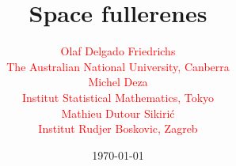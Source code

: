 \documentclass{beamer}
\begin{document}
\title{Space fullerenes}
\author{
{\small
\begin{multicols}{2}
\textcolor{red}{\large Olaf Delgado Friedrichs}\\[2mm]
\textcolor{red}{The Australian National University, Canberra}\\[2mm]
\textcolor{red}{\large Michel Deza}\\[2mm]
\textcolor{red}{Institut Statistical Mathematics, Tokyo}
\end{multicols}
\begin{center}
\textcolor{red}{\large Mathieu Dutour Sikiri\'c}\\[2mm]
\textcolor{red}{Institut Rudjer Boskovic, Zagreb}
\end{center}
}
}
\date{\today} 

\frame{\titlepage} 


\end{document}
